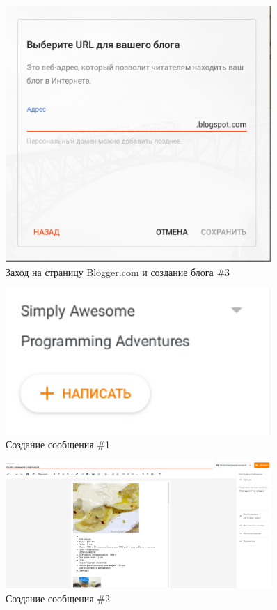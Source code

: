 \documentclass[14pt]{extarticle}
\begin{document}
\begin{figure}[h]
    \centering
	\includegraphics[width=0.9\textwidth, angle=0]{2021-12-12_21-41_1}
    \caption{Заход на страницу Blogger.com и создание блога \#3}
    \label{fig:html3}
\end{figure}

\begin{figure}[h]
    \centering
	\includegraphics[width=0.9\textwidth, angle=0]{2021-12-12_21-47}
    \caption{Создание сообщения \#1}
    \label{fig:html4}
\end{figure}

\begin{figure}[h]
    \centering
	\includegraphics[width=0.9\textwidth, angle=0]{2021-12-12_21-50}
    \caption{Создание сообщения \#2}
    \label{fig:html5}
\end{figure}
\end{document}
